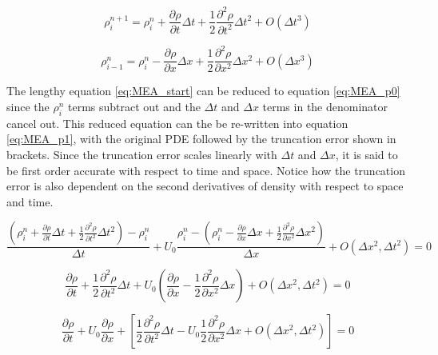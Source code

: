     \begin{equation}
    	\label{eq:rho_taylor_series_time}
    	\rho_{i}^{n+1} =  \rho_{i}^{n} + 
    	\frac{\partial \rho}{\partial t} \Delta t +
    	\frac{1}{2} \frac{\partial^2 \rho}{\partial t^2} \Delta t^2 + O(\Delta t^{3})
    \end{equation}
    
    \begin{equation}
    	\label{eq:rho_taylor_series_space}
    	\rho_{i-1}^{n} =  \rho_{i}^{n} - 
    	\frac{\partial \rho}{\partial x} \Delta x +
    	\frac{1}{2} \frac{\partial^2 \rho}{\partial x^2} \Delta x^2 + O(\Delta x^{3})
    \end{equation}
    
    The lengthy equation \ref{eq:MEA_start} can be reduced to equation
    \ref{eq:MEA_p0} since the $\rho_{i}^{n}$ terms subtract out and the $\Delta
    t$ and $\Delta x$ terms in the denominator cancel out. This reduced equation
    can the be re-written into equation \ref{eq:MEA_p1}, with the original PDE
    followed by the truncation error shown in brackets. Since the truncation
    error scales linearly with $\Delta t$ and $\Delta x$, it is said to be first
    order accurate with respect to time and space. Notice how the truncation
    error is also dependent on the second derivatives of density with respect to
    space and time.
    
    \begin{equation}
    	\label{eq:MEA_start}
    	\frac{ \left( \rho_{i}^{n} + \frac{\partial \rho}{\partial t} \Delta t +
    	\frac{1}{2} \frac{\partial^2 \rho}{\partial t^2} \Delta t^2 \right)-\rho_{i}^{n} }{\Delta t} 
    	+ U_{0} \frac{\rho_{i}^{n} - \left( \rho_{i}^{n} -  \frac{\partial \rho}{\partial x} \Delta x + 
    	\frac{1}{2} \frac{\partial^2 \rho}{\partial x^2} \Delta x^2 \right)}{\Delta x} 
    	+ O(\Delta x^{2},\Delta t^{2}) 
    	= 0
    \end{equation}
    
    \begin{equation}
    	\label{eq:MEA_p0}
    	 \frac{\partial \rho}{\partial t}  + \frac{1}{2} \frac{\partial^2 \rho}{\partial t^2} \Delta t +
    	 U_{0} \left(   \frac{\partial \rho}{\partial x}  - \frac{1}{2} \frac{\partial^2 \rho}{\partial x^2} \Delta x \right) 
    	 + O(\Delta x^{2},\Delta t^{2}) 
    	 = 0
    \end{equation}
    
    \begin{equation}
    	\label{eq:MEA_p1}
    	 \frac{\partial \rho}{\partial t}  +  U_{0} \frac{\partial \rho}{\partial x}
    	 + \left[
    	      \frac{1}{2} \frac{\partial^2 \rho}{\partial t^2} \Delta t 
    	    - U_{0}  \frac{1}{2} \frac{\partial^2 \rho}{\partial x^2} \Delta x  
    	    + O(\Delta x^{2},\Delta t^{2})
    	   \right] 
    	 = 0 
    \end{equation} \linebreak
    
